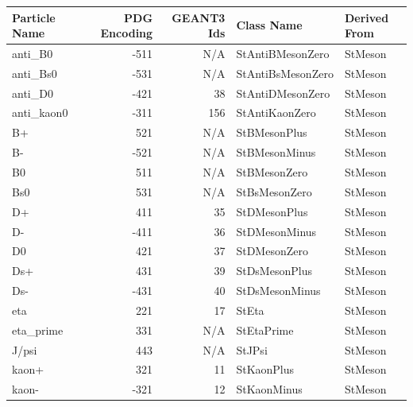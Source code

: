 \documentclass[twoside]{article}
\begin{document}
\begin{table}[htb]
    \begin{center}
    \begin{tabular}{|l|r|r|l| l |}
        \hline
        \textbf{Particle Name} & \textbf{PDG Encoding} & \textbf{GEANT3 Ids}  & \textbf{Class Name} & \textbf{Derived From} \\ \hline
       anti\_B0  & -511  & N/A  &     StAntiBMesonZero  & StMeson        \\ \hline
      anti\_Bs0  & -531  & N/A  &    StAntiBsMesonZero  & StMeson        \\ \hline
       anti\_D0  & -421  & 38   &     StAntiDMesonZero  & StMeson        \\ \hline
    anti\_kaon0  & -311  & 156  &       StAntiKaonZero  & StMeson        \\ \hline
            B+  & 521   & N/A   &         StBMesonPlus  & StMeson        \\ \hline
            B-  & -521  & N/A   &        StBMesonMinus  & StMeson        \\ \hline
            B0  & 511   & N/A   &         StBMesonZero  & StMeson        \\ \hline
           Bs0  & 531   & N/A   &        StBsMesonZero  & StMeson        \\ \hline
            D+  & 411   & 35    &         StDMesonPlus  & StMeson        \\ \hline
            D-  & -411  & 36    &        StDMesonMinus  & StMeson        \\ \hline
            D0  & 421   & 37    &         StDMesonZero  & StMeson        \\ \hline
           Ds+  & 431   & 39    &        StDsMesonPlus  & StMeson        \\ \hline
           Ds-  & -431  & 40    &       StDsMesonMinus  & StMeson        \\ \hline
           eta  & 221   & 17    &                StEta  & StMeson        \\ \hline
     eta\_prime  & 331   & N/A  &           StEtaPrime  & StMeson        \\ \hline
         J/psi  & 443   & N/A   &               StJPsi  & StMeson        \\ \hline
         kaon+  & 321   & 11    &           StKaonPlus  & StMeson        \\ \hline
         kaon-  & -321  & 12    &          StKaonMinus  & StMeson        \\ \hline

\end{tabular}
\end{center}
\end{table}
\end{document}
